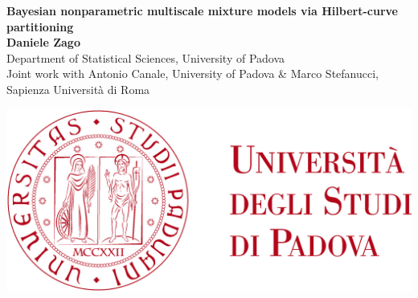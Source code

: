 \documentclass[a0,portrait]{a0poster}
\begin{document}


\begin{minipage}[c]{0.75\linewidth}
\huge \color{DarkRed} \textbf{Bayesian nonparametric multiscale mixture models via Hilbert-curve partitioning}\\[0.5cm]  \color{Black} %
\huge \textbf{Daniele Zago}\\[0.5cm] %
\Large Department of Statistical Sciences, University of Padova \\[0.5cm]
\large
Joint work with Antonio Canale,  University of Padova \& Marco Stefanucci, Sapienza Università di Roma
\end{minipage}
%
\begin{minipage}[c]{0.25\linewidth}
\includegraphics[scale=0.2]{logo_unipd}
\end{minipage}

\vspace{1cm} %

\end{document}
